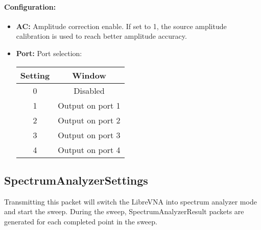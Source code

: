 \documentclass[a4paper,11pt]{article}
\newcommand{\bitrect}[2]{
  \begin{pgfonlayer}{foreground}
    \draw [thick] (0,0) rectangle (#1,1);
    \pgfmathsetmacro\result{#1-1}
    \foreach \x in {1,...,\result}
      \draw [thick] (\x,1) -- (\x, 0.8);
  \end{pgfonlayer}
  \bitlabels{#1}{#2}
}
\newcommand{\rwbits}[3]{
  \draw [thick] (#1,0) rectangle ++(#2,1) node[pos=0.5]{#3};
  \pgfmathsetmacro\start{#1+0.5}
  \pgfmathsetmacro\finish{#1+#2-0.5}
}
\newcommand{\robits}[3]{
  \begin{pgfonlayer}{background}
    \draw [thick, fill=lightgray] (#1,0) rectangle ++(#2,1) node[pos=0.5]{#3};
  \end{pgfonlayer}
  \pgfmathsetmacro\start{#1+0.5}
  \pgfmathsetmacro\finish{#1+#2-0.5}
}
\newcommand{\bitlabels}[2]{
  \foreach \bit in {1,...,#1}{
     \pgfmathsetmacro\result{#2}
     \node [above] at (\bit-0.5, 1) {\pgfmathprintnumber{\result}};
   }
}
\begin{document}
\paragraph{Configuration:}
\begin{center}
\end{center}

\begin{itemize}
\item \textbf{AC:} Amplitude correction enable. If set to 1, the source amplitude calibration is used to reach better amplitude accuracy.
\item \textbf{Port:} Port selection:
\begin{center}
\begin{tabular}{ c|c }
Setting & Window\\
 \hline
0 & Disabled \\
1 & Output on port 1\\
2 & Output on port 2\\
3 & Output on port 3\\
4 & Output on port 4\\
\end{tabular}
\end{center}
\end{itemize}

\subsection{SpectrumAnalyzerSettings}
Transmitting this packet will switch the LibreVNA into spectrum analyzer mode and start the sweep. During the sweep, SpectrumAnalyzerResult packets are generated for each completed point in the sweep.
\end{document}
